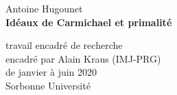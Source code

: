 \begin{center}
	\large Antoine Hugounet \\

	\vspace{30px}
	\LARGE \textbf{Idéaux de Carmichael et primalité}

	\vspace{30px}
	\large
	travail encadré de recherche \\
	encadré par Alain Kraus (IMJ-PRG) \\
	de janvier à juin 2020 \\

	\vspace{20px}
	Sorbonne Université

	\vspace{1cm}
	\begin{center}
	\end{center}

	\normalsize
	\renewcommand{\contentsname}{}
	\vspace{10px}
	\tableofcontents
\end{center}
